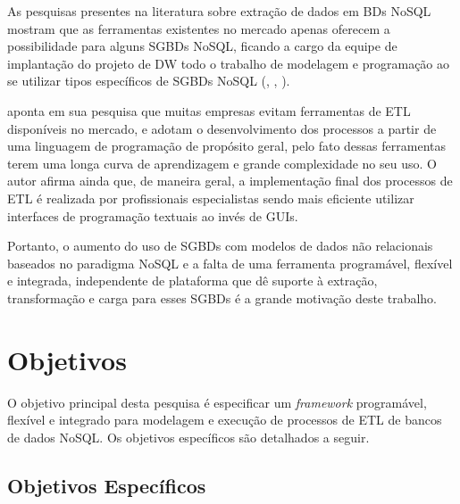 As pesquisas presentes na literatura sobre extração de dados em BDs NoSQL mostram que as ferramentas existentes no mercado apenas oferecem a possibilidade para alguns SGBDs NoSQL, ficando a cargo da equipe de implantação do projeto de DW todo o trabalho de modelagem e programação ao se utilizar tipos específicos de SGBDs NoSQL (\cite{silva:2016}, \cite{chevalier:2015}, \cite{liu:2013}).

\cite{silva:2012} aponta em sua pesquisa que muitas empresas evitam ferramentas de ETL disponíveis no mercado, e adotam o desenvolvimento dos processos a partir de uma linguagem de programação de propósito geral, pelo fato dessas ferramentas terem uma longa curva de aprendizagem e grande complexidade no seu uso. O autor afirma ainda que, de maneira geral, a implementação final dos processos de ETL é realizada por profissionais especialistas sendo mais eficiente utilizar interfaces de programação textuais ao invés de GUIs.


Portanto, o aumento do uso de SGBDs com modelos de dados não relacionais baseados no paradigma NoSQL e a falta de uma ferramenta programável, flexível e integrada, independente de plataforma que dê suporte à extração, transformação e carga para esses SGBDs é a grande motivação deste trabalho.






\section{Objetivos}

O objetivo principal desta pesquisa é especificar um \textit{framework} programável, flexível e integrado para modelagem e execução de processos de ETL de bancos de dados NoSQL. Os objetivos específicos são detalhados a seguir.

\subsection{Objetivos Específicos}

